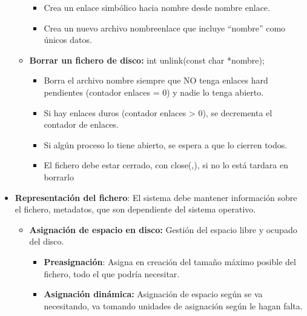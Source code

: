 \documentclass[12pt, twoside, openright]{report} %
\begin{document}
\begin{itemize}
\begin{itemize}
\begin{itemize}
      \item Crea un enlace simbólico hacia nombre desde nombre enlace.
        
      \item Crea un nuevo archivo nombreenlace que incluye \enquote{nombre} como
        únicos datos.
        
      \end{itemize}
    \item \textbf{Borrar un fichero de disco:} int unlink(const char
      *nombre);
      

      \begin{itemize}
      \item Borra el archivo nombre siempre que NO tenga enlaces hard
        pendientes (contador enlaces = 0) y nadie lo tenga abierto.
        
      \item Si hay enlaces duros (contador enlaces \textgreater{} 0), se
        decrementa el contador de enlaces.
        
      \item Si algún proceso lo tiene abierto, se espera a que lo cierren
        todos.
        
      \item El fichero debe estar cerrado, con close(,), si no lo está
        tardara en borrarlo
        
      \end{itemize}
    \end{itemize}
	\pagebreak
  \item \textbf{Representación del fichero}: El sistema debe mantener
    información sobre el fichero, metadatos, que son dependiente del
    sistema operativo.
    

    \begin{itemize}
    \item \textbf{Asignación de espacio en disco:} Gestión del espacio libre
      y ocupado del disco.
      

      \begin{itemize}
      \item \textbf{Preasignación}: Asigna en creación del tamaño máximo
        posible del fichero, todo el que podría necesitar.
        
      \item \textbf{Asignación dinámica:} Asignación de espacio según se va
        necesitando, va tomando unidades de asignación según le hagan
        falta.
        

\end{itemize}
\end{itemize}
\end{itemize}
\end{document}
